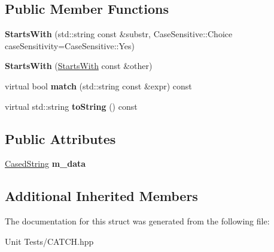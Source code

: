 \subsection*{Public Member Functions}
\begin{DoxyCompactItemize}
\item 
{\bfseries Starts\+With} (std\+::string const \&substr, Case\+Sensitive\+::\+Choice case\+Sensitivity=Case\+Sensitive\+::\+Yes)\hypertarget{structCatch_1_1Matchers_1_1Impl_1_1StdString_1_1StartsWith_a0db1bd8876219464ae60346c9525bcf6}{}\label{structCatch_1_1Matchers_1_1Impl_1_1StdString_1_1StartsWith_a0db1bd8876219464ae60346c9525bcf6}

\item 
{\bfseries Starts\+With} (\hyperlink{structCatch_1_1Matchers_1_1Impl_1_1StdString_1_1StartsWith}{Starts\+With} const \&other)\hypertarget{structCatch_1_1Matchers_1_1Impl_1_1StdString_1_1StartsWith_a5526cb587632e7e46253d6f60ae01098}{}\label{structCatch_1_1Matchers_1_1Impl_1_1StdString_1_1StartsWith_a5526cb587632e7e46253d6f60ae01098}

\item 
virtual bool {\bfseries match} (std\+::string const \&expr) const \hypertarget{structCatch_1_1Matchers_1_1Impl_1_1StdString_1_1StartsWith_ae9c893adbacc853171a488aea5355653}{}\label{structCatch_1_1Matchers_1_1Impl_1_1StdString_1_1StartsWith_ae9c893adbacc853171a488aea5355653}

\item 
virtual std\+::string {\bfseries to\+String} () const \hypertarget{structCatch_1_1Matchers_1_1Impl_1_1StdString_1_1StartsWith_a066fe10e74495cb556abc6895193ba97}{}\label{structCatch_1_1Matchers_1_1Impl_1_1StdString_1_1StartsWith_a066fe10e74495cb556abc6895193ba97}

\end{DoxyCompactItemize}
\subsection*{Public Attributes}
\begin{DoxyCompactItemize}
\item 
\hyperlink{structCatch_1_1Matchers_1_1Impl_1_1StdString_1_1CasedString}{Cased\+String} {\bfseries m\+\_\+data}\hypertarget{structCatch_1_1Matchers_1_1Impl_1_1StdString_1_1StartsWith_accaace83106244c635d251addb028125}{}\label{structCatch_1_1Matchers_1_1Impl_1_1StdString_1_1StartsWith_accaace83106244c635d251addb028125}

\end{DoxyCompactItemize}
\subsection*{Additional Inherited Members}


The documentation for this struct was generated from the following file\+:\begin{DoxyCompactItemize}
\item 
Unit Tests/C\+A\+T\+C\+H.\+hpp\end{DoxyCompactItemize}
